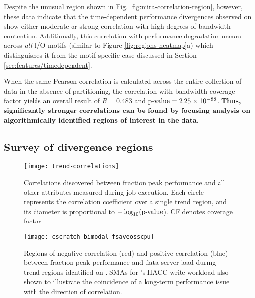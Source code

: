 Despite the unusual region shown in Fig. \ref{fig:mira-correlation-region},
however, these data indicate that the time-dependent performance divergences observed on \mira show either moderate or strong correlation with high degrees of bandwidth contention.
Additionally, this correlation with performance degradation occurs across
\emph{all} I/O motifs (similar to Figure \ref{fig:regions-heatmap}a) which
distinguishes it from the motif-specific case discussed in Section
\ref{sec:features/timedependent}.  

When the same Pearson correlation is calculated across the entire collection
of \mira \mirafsone data in the absence of partitioning, the correlation with bandwidth coverage factor
yields an overall result of $R = 0.483$ and $\textup{p-value} =
2.25\times 10^{-88}$.  \textbf{Thus, significantly stronger
correlations can be found by focusing analysis on algorithmically identified regions of
interest in the data.}


\subsection{Survey of divergence regions} \label{sec:results/correlate-all}




\begin{figure}
    \centering
    \texttt{[image: trend-correlations]}
    \vspace{-.35in}
    \caption{Correlations discovered between fraction peak performance and all other attributes measured during job execution.
    Each circle represents the correlation coefficient over a single trend region, and its diameter is proportional to $-\log_{10}(\textup{p-value}$).
    CF denotes coverage factor.}
    \label{fig:trend-correlations}
\end{figure}


\begin{figure}
    \centering
    \texttt{[image: cscratch-bimodal-fsaveosscpu]}
    \vspace{-.35in}
    \caption{Regions of negative correlation (red) and positive correlation (blue) between fraction peak performance and data server load during trend regions identified on \cori.
    SMAs for \cori's HACC write workload also shown to illustrate the coincidence of a long-term performance issue with the direction of correlation.}
    \label{fig:cscratch-bimodal-fsaveosscpu}
\end{figure}

